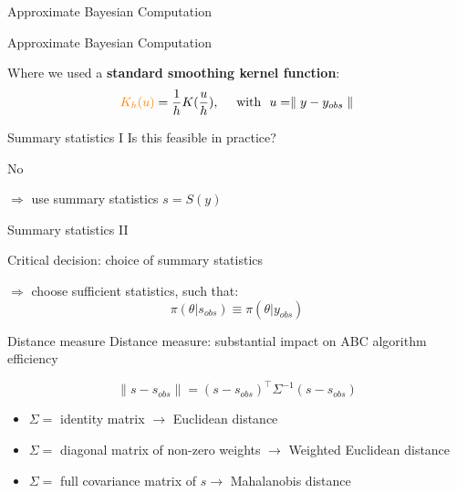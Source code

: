 \documentclass{beamer}
\begin{document}
\begin{section}{Approximate Bayesian Computation}
	\begin{frame}{Approximate Bayesian Computation}

	

		\pause
		\vspace{0.7cm}
		Where we used a \textbf{standard smoothing kernel function}:
		\[ \textcolor{orange}{K_h(u)}  =  \frac{1}{h}  K  ( \frac{u}{h} ), \quad \text{ with } \  u=\parallel y-y_{obs} \parallel \]
		
		
	\end{frame}

	\begin{frame}{Summary statistics I}
		Is this feasible in practice?
		
		\pause
		\vspace{0.3cm}
		No
		
		\pause
		\vspace{0.3cm}
		$\Longrightarrow$ use summary statistics $s = S(y)$
	\end{frame}
		
	\begin{frame}{Summary statistics II}
		
		Critical decision: choice of summary statistics
			
		\pause
		\vspace{0.3cm}
		$\Longrightarrow$ choose sufficient statistics, such that:
		\[   \pi(\theta|s_{obs}) \equiv \pi(\theta|y_{obs})   \]

	\end{frame}

	\begin{frame}{Distance measure}
		Distance measure: substantial impact on ABC algorithm efficiency
		
		\[  \parallel s - s_{obs} \parallel = (s - s_{obs})^\top \Sigma^{-1} (s - s_{obs}) \]
		
		\pause
		\vspace{1cm}
		\begin{itemize}
			\item $\Sigma = $ identity matrix $ \rightarrow$ Euclidean distance 
			\item $\Sigma =$ diagonal matrix of non-zero weights $ \rightarrow$ Weighted Euclidean distance 
			\item $\Sigma = $ full covariance matrix of $s \rightarrow$ Mahalanobis distance 
		\end{itemize}
	\end{frame}


\end{section}
\end{document}
